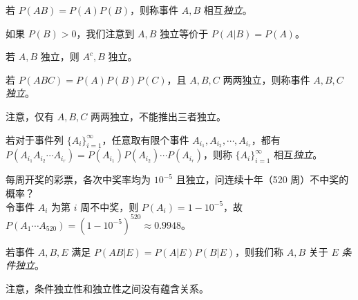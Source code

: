 \documentclass[../main.tex]{subfiles}
\begin{document}
\begin{definition}\label{def:1.7.1}
若 $P(AB)=P(A)P(B)$，则称事件 $A,B$ 相互\emph{独立}。
\end{definition}

如果 $P(B)>0$，我们注意到 $A,B$ 独立等价于 $P(A|B)=P(A)$。

\begin{proposition}
若 $A,B$ 独立，则 $A^c,B$ 独立。
\end{proposition}

\begin{definition}\label{def:1.7.2}
若 $P(ABC)=P(A)P(B)P(C)$，且 $A,B,C$ 两两独立，则称事件 $A,B,C$ \emph{独立}。
\end{definition}

注意，仅有 $A,B,C$ 两两独立，不能推出三者独立。

\begin{definition}\label{def:1.7.3}
若对于事件列 $\{A_i\}_{i=1}^\infty$，任意取有限个事件 $A_{i_1},A_{i_2},\cdots,A_{i_r}$，都有 $P(A_{i_1}A_{i_2}\cdots A_{i_r})=P(A_{i_1})P(A_{i_2})\cdots P(A_{i_r})$，则称 $\{A_i\}_{i=1}^\infty$ 相互\emph{独立}。
\end{definition}

\begin{example}
每周开奖的彩票，各次中奖率均为 $10^{-5}$ 且独立，问连续十年（520 周）不中奖的概率？\\
令事件 $A_i$ 为第 $i$ 周不中奖，则 $P(A_i)=1-10^{-5}$，故 $P(A_1\cdots A_{520})=(1-10^{-5})^{520}\approx 0.9948$。
\end{example}

\begin{definition}\label{def:1.7.4}
若事件 $A,B,E$ 满足 $P(AB|E)=P(A|E)P(B|E)$，则我们称 $A,B$ 关于 $E$ \emph{条件独立}。
\end{definition}

注意，条件独立性和独立性之间没有蕴含关系。
\end{document}
